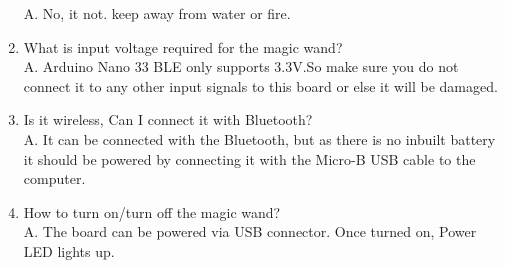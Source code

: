 \begin{enumerate}
	A. No, it not. keep away from water or fire.\\
	
	\item What is input voltage required for the magic wand?\\
	
	A. Arduino Nano 33 BLE only supports 3.3V.So make sure you do not connect it to any other input signals to this board or else it will be damaged. \\
	
	\item Is it wireless, Can I connect it with Bluetooth?\\
	
	A. It can be connected with the Bluetooth, but as there is no inbuilt battery it should be powered by connecting it with the Micro-B USB cable to the computer.\\
	
	\item How to turn on/turn off the magic wand?\\
	
	A. The board can be powered via USB connector. Once turned on, Power LED lights up.
	
\end{enumerate}
